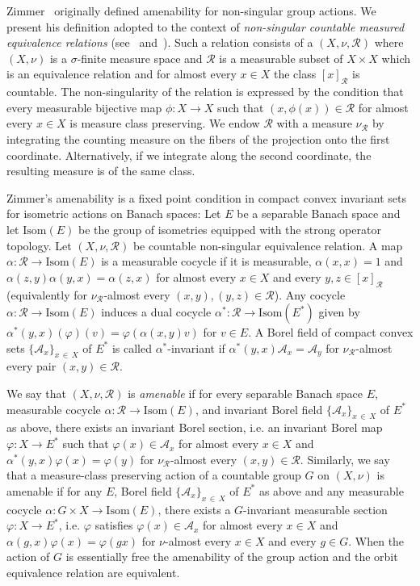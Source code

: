 \documentclass[AHL,Unicode,longabstracts,published]{cedram}
\newcommand{\calR}{\mathcal{R}}
\newcommand{\calA}{\mathcal{A}}
\newcommand{\Isom}{\mathrm{Isom}}
\begin{document}
Zimmer~\cite{Zimmer78} originally defined amenability for non-singular group actions. We present his definition adopted to the context of \emph{non-singular countable measured equivalence relations} (see~\cite{Adams90} and~\cite{ConnesFeldmanWeiss}). Such a relation consists of a $(X,\nu,\calR)$ where $(X,\nu)$ is a $\sigma$-finite measure space and $\calR$ is a measurable subset of $X\times X$ which is an equivalence relation and for almost every $x\in X$ the class $[x]_\calR$ is countable. The non-singularity of the relation is expressed by the condition that every measurable bijective map $\phi\colon X\to X$ such that $(x,\phi(x))\in \calR$ for almost every $x\in X$ is measure class preserving. We endow $\calR$ with a measure $\nu_{\calR}$ by integrating the counting measure on the fibers of the projection onto the first coordinate. Alternatively, if we integrate along the second coordinate, the resulting measure is of the same class.

Zimmer's amenability is a fixed point condition in compact convex invariant sets for isometric actions on Banach spaces: Let $E$ be a separable Banach space and let $\Isom(E)$ be the group of isometries equipped with the strong operator topology. Let $(X,\nu,\calR)$ be countable non-singular equivalence relation. A map $\alpha\colon\calR\to \Isom(E)$ is a measurable cocycle if it is measurable, $\alpha(x,x)=1$ and $\alpha(z,y)\alpha(y,x)=\alpha(z,x)$ for almost every $x\in X$ and every $y,z\in [x]_\calR$ (equivalently for $\nu_{\calR}$-almost every $(x,y),(y,z)\in \calR$). Any cocycle $\alpha\colon \calR\to \Isom(E)$ induces a dual cocycle $\alpha^*\colon \calR\to \Isom(E^*)$ given by $\alpha^*(y,x)(\varphi)(v)=\varphi(\alpha(x,y)v)$ for $v\in E.$ A Borel field of compact convex sets $\{\calA_x\}_{x\,\in\,X}$ of $E^*$ is called $\alpha^*$-invariant if $\alpha^*(y,x)\calA_x=\calA_y$ for $\nu_\calR$-almost every pair $(x,y)\in\calR$.

We say that $(X,\nu,\calR)$ is \emph{amenable} if for every separable Banach space $E$, measurable cocycle $\alpha\colon \calR\to \Isom(E)$, and invariant Borel field $\{\calA_x\}_{x\,\in\,X}$ of $E^*$ as above, there exists an invariant Borel section, i.e. an invariant Borel map $\varphi\colon X\to E^*$ such that $\varphi(x)\in \calA_x$ for almost every $x\in X$ and $\alpha^*(y,x)\varphi(x)=\varphi(y)$ for $\nu_{\calR}$-almost every $(x,y)\in\calR$. Similarly, we say that a measure-class preserving action of a countable group $G$ on $(X,\nu)$ is amenable if for any $E$, Borel field $\{\calA_x\}_{x\,\in\,X}$ of $E^*$ as above and any measurable cocycle $\alpha\colon G\times X \to \Isom(E)$, there exists a $G$-invariant measurable section $\varphi\colon X\to E^*$, i.e. $\varphi$ satisfies $\varphi(x)\in \calA_x$ for almost every $x\in X$ and $\alpha(g,x)\varphi(x)=\varphi(gx) $ for $\nu$-almost every $x\in X$ and every $g\in G$. When the action of $G$ is essentially free the amenability of the group action and the orbit equivalence relation are equivalent.
\end{document}
